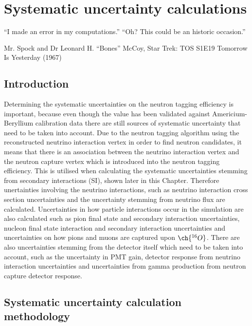 \chapter{Systematic uncertainty calculations}
\epigraph{``I made an error in my computations.''\newline
``Oh? This could be an historic occasion.''}{Mr. Spock and Dr Leonard H. ``Bones'' McCoy, Star Trek: TOS S1E19 Tomorrow Is Yesterday (1967)}
\label{chp:syst}

\section{Introduction}

Determining the systematic uncertainties on the neutron tagging efficiency is important, because even though the value has been validated against Americium-Beryllium calibration data there are still sources of systematic uncertainty that need to be taken into account. Due to the neutron tagging algorithm using the reconstructed neutrino interaction vertex in order to find neutron candidates, it means that there is an association between the neutrino interaction vertex and the neutron capture vertex which is introduced into the neutron tagging efficiency. This is utilised when calculating the systematic uncertainties stemming from secondary interactions (SI), shown later in this Chapter. Therefore unertainties involving the neutrino interactions, such as neutrino interaction cross section uncertainties and the uncertainty stemming from neutrino flux are calculated. Uncertainties in how particle interactions occur in the simulation are also calculated such as pion final state and secondary interaction uncertainties, nucleon final state interaction and secondary interaction uncertainties and uncertainties on how pions and muons are captured upon $\ch{^{16}O}$. There are also uncertainties stemming from the detector itself which need to be taken into account, such as the uncertainty in PMT gain, detector response from neutrino interaction uncertainties and uncertainties from gamma production from neutron capture detector response. 

\section{Systematic uncertainty calculation methodology}

